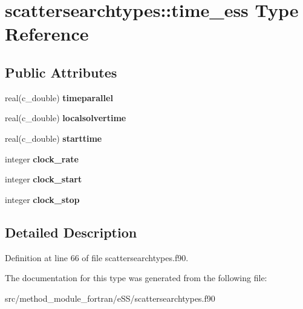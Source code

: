 \hypertarget{structscattersearchtypes_1_1time__ess}{\section{scattersearchtypes\-:\-:time\-\_\-ess Type Reference}
\label{structscattersearchtypes_1_1time__ess}
}
\subsection*{Public Attributes}
\begin{DoxyCompactItemize}
\item 
\hypertarget{structscattersearchtypes_1_1time__ess_abfe9a3b6157945f98006fc0d859fb7e8}{real(c\-\_\-double) {\bfseries timeparallel}}\label{structscattersearchtypes_1_1time__ess_abfe9a3b6157945f98006fc0d859fb7e8}

\item 
\hypertarget{structscattersearchtypes_1_1time__ess_addb1337635dec91ba25d12da038aff16}{real(c\-\_\-double) {\bfseries localsolvertime}}\label{structscattersearchtypes_1_1time__ess_addb1337635dec91ba25d12da038aff16}

\item 
\hypertarget{structscattersearchtypes_1_1time__ess_ad9df2f4f585afcf84619d6008cf7ba52}{real(c\-\_\-double) {\bfseries starttime}}\label{structscattersearchtypes_1_1time__ess_ad9df2f4f585afcf84619d6008cf7ba52}

\item 
\hypertarget{structscattersearchtypes_1_1time__ess_ab1d82205d00a139d763b32bbf2191cd8}{integer {\bfseries clock\-\_\-rate}}\label{structscattersearchtypes_1_1time__ess_ab1d82205d00a139d763b32bbf2191cd8}

\item 
\hypertarget{structscattersearchtypes_1_1time__ess_aa445f905606ded8c67ad532d58894d78}{integer {\bfseries clock\-\_\-start}}\label{structscattersearchtypes_1_1time__ess_aa445f905606ded8c67ad532d58894d78}

\item 
\hypertarget{structscattersearchtypes_1_1time__ess_abaa23e70e15a9a64ef14c3bb7019bbe3}{integer {\bfseries clock\-\_\-stop}}\label{structscattersearchtypes_1_1time__ess_abaa23e70e15a9a64ef14c3bb7019bbe3}

\end{DoxyCompactItemize}


\subsection{Detailed Description}


Definition at line 66 of file scattersearchtypes.\-f90.



The documentation for this type was generated from the following file\-:\begin{DoxyCompactItemize}
\item 
src/method\-\_\-module\-\_\-fortran/e\-S\-S/scattersearchtypes.\-f90\end{DoxyCompactItemize}

